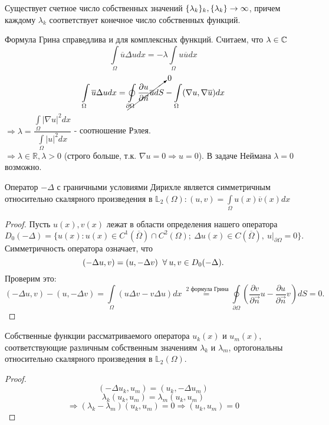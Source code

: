 \begin{statement}
Существует счетное число собственных значений $\{\lambda_k\}_k,  \\ \{\lambda_k\} \to \infty$, причем каждому $\lambda_k$ соответствует конечное число собственных функций.
\end{statement} 
Формула Грина справедлива и для комплексных функций. Считаем, что $\lambda \in \mathbb{C}$
$$
\int\limits_{\Omega} \overline{u} \Delta u dx = - \lambda \int\limits_{\Omega} u \overline{u} dx$$
$$
\int\limits_{\Omega} \overline{u} \Delta u dx = \cancelto{0}{\oint\limits_{\partial \Omega} \frac{\partial u}{\partial \vec{n}} \overline{u} dS }- \int\limits_{\Omega} (\nabla u, \nabla \overline{u}) dx$$
$\Rightarrow \lambda = \dfrac{\int\limits_{\Omega}|\nabla u|^2 dx}{\int\limits_{\Omega}|u|^2 dx}$ - соотношение Рэлея.\\
$\Rightarrow \lambda \in \mathbb{R}, \lambda >0 $ (строго больше, т.к. $\nabla u = 0 \Rightarrow u =0$). В задаче Неймана $\lambda = 0$ возможно.\\
\begin{statement} Оператор $-\Delta$ с граничными условиями Дирихле является симметричным относительно скалярного произведения в $\mathbb{L}_2(\Omega): (u,v) = \int\limits_{\Omega} u(x) \overline{v}(x)dx $ 
\end{statement}
\begin{proof}
Пусть $u(x), v(x)$ лежат в области  определения нашего оператора $$D_0(-\Delta) = \{u(x): u(x) \in C^1(\overline{\Omega}) \cap C^2(\Omega); \ \Delta u(x) \in C(\overline{\Omega}), \ u|_{\partial \Omega} = 0 \}.$$
Симметричность оператора означает, что $$(-\Delta u,v)=(u, -\Delta v) \;\;\forall\: u,v \in D_0(-\Delta).$$ Проверим это: $$ (-\Delta u,v) - (u, -\Delta v) = \int\limits_{\Omega} (u \Delta v- v \Delta u)dx \stackrel{\text{ 2 формула Грина}}{=} \oint \limits_{\partial \Omega} ( \frac{\partial v}{\partial \vec{n}}u - \frac{\partial u}{\partial \vec{n}}v) dS =0.$$
\end{proof}
\begin{statement} Собственные функции рассматриваемого оператора $u_k(x)$ и $u_m(x)$, соответствующие различным собственным значениям $\lambda_k$ и $\lambda_m$, ортогональны относительно скалярного произведения в $\mathbb{L}_2(\Omega)$.
\end{statement}
\begin{proof}
$$(-\Delta u_k, u_m) = (u_k, -\Delta u_m)$$ $$\lambda_k (u_k, u_m)=  \lambda_m (u_k, u_m)$$ $$\Rightarrow (\lambda_k - \lambda_m) (u_k, u_m) = 0 \Rightarrow (u_k, u_m) = 0 $$
\end{proof}
 
 